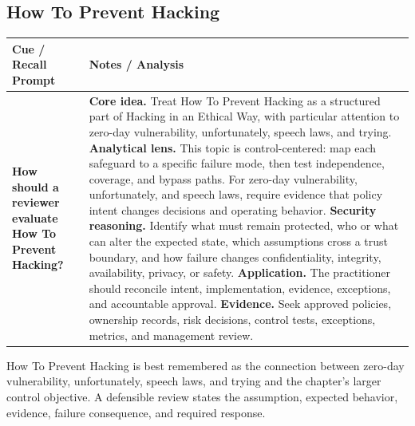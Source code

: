 \documentclass[11pt]{article}
\newcommand{\CornellHeader}{%
\rowcolor{Navy}\color{white}\bfseries Cue / Recall Prompt & \color{white}\bfseries Notes / Analysis\\\hline}
\newcommand{\CornellRow}[2]{%
\cellcolor{CueGray}\RaggedRight\textbf{#1} & \RaggedRight #2\\\hline}
\begin{document}
\subsection*{How To Prevent Hacking}
\begin{longtable}{>{\RaggedRight\arraybackslash}p{}|>{\RaggedRight\arraybackslash}p{}}
\CornellHeader
\CornellRow{How should a reviewer evaluate How To Prevent Hacking?}{\textbf{Core idea.} Treat How To Prevent Hacking as a structured part of Hacking in an Ethical Way, with particular attention to zero-day vulnerability, unfortunately, speech laws, and trying. \textbf{Analytical lens.} This topic is control-centered: map each safeguard to a specific failure mode, then test independence, coverage, and bypass paths. For zero-day vulnerability, unfortunately, and speech laws, require evidence that policy intent changes decisions and operating behavior. \textbf{Security reasoning.} Identify what must remain protected, who or what can alter the expected state, which assumptions cross a trust boundary, and how failure changes confidentiality, integrity, availability, privacy, or safety. \textbf{Application.} The practitioner should reconcile intent, implementation, evidence, exceptions, and accountable approval. \textbf{Evidence.} Seek approved policies, ownership records, risk decisions, control tests, exceptions, metrics, and management review.}
\end{longtable}
\begin{topicsummary}
How To Prevent Hacking is best remembered as the connection between zero-day vulnerability, unfortunately, speech laws, and trying and the chapter's larger control objective. A defensible review states the assumption, expected behavior, evidence, failure consequence, and required response.
\end{topicsummary}
\end{document}
